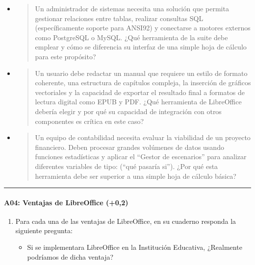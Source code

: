 \documentclass[letterpaper,10pt,spanish]{sphinxmanual}
\begin{document}
\begin{enumerate}
\begin{itemize}
\item {} \begin{quote}

\sphinxAtStartPar
Un administrador de sistemas necesita una solución que permita gestionar relaciones entre tablas, realizar consultas SQL (específicamente soporte para ANSI\sphinxhyphen{}92) y conectarse a motores externos como PostgreSQL o MySQL. ¿Qué herramienta de la suite debe emplear y cómo se diferencia su interfaz de una simple hoja de cálculo para este propósito?
\end{quote}

\item {} \begin{quote}

\sphinxAtStartPar
Un usuario debe redactar un manual que requiere un estilo de formato coherente, una estructura de capítulos compleja, la inserción de gráficos vectoriales y la capacidad de exportar el resultado final a formatos de lectura digital como EPUB y PDF. ¿Qué herramienta de LibreOffice debería elegir y por qué su capacidad de integración con otros componentes es crítica en este caso?
\end{quote}

\item {} \begin{quote}

\sphinxAtStartPar
Un equipo de contabilidad necesita evaluar la viabilidad de un proyecto financiero. Deben procesar grandes volúmenes de datos usando funciones estadísticas y aplicar el “Gestor de escenarios” para analizar diferentes variables de tipo: (“qué pasaría si”). ¿Por qué esta herramienta debe ser superior a una simple hoja de cálculo básica?
\end{quote}

\end{itemize}

\end{enumerate}


\bigskip\hrule\bigskip



\paragraph{A04: Ventajas de LibreOffice (+0,2)}
\label{\detokenize{cursos/ofimatica10/periodo01/G03:a04-ventajas-de-libreoffice-0-2}}
\sphinxAtStartPar
{}
\begin{enumerate}
%
\item {} 
\sphinxAtStartPar
Para cada una de las ventajas de LibreOffice, en su cuaderno responda la siguiente pregunta:
\begin{itemize}
\item {} 
\sphinxAtStartPar
Si se implementara LibreOffice en la Institución Educativa, ¿Realmente podríamos  de dicha ventaja?

\end{itemize}

\end{enumerate}
\end{document}
